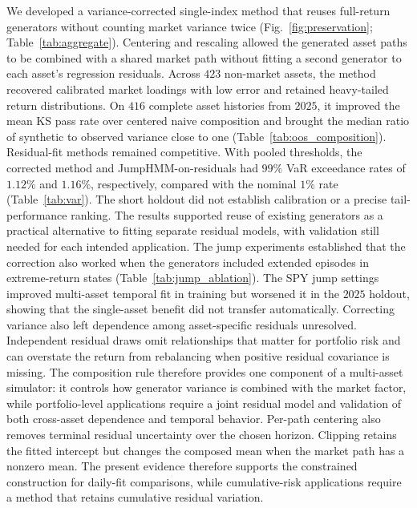 We developed a variance-corrected single-index method that reuses
full-return generators without counting market variance twice (Fig.~\ref{fig:preservation};
Table~\ref{tab:aggregate}). Centering and rescaling allowed the
generated asset paths to be combined with a shared market path without
fitting a second generator to each asset's regression residuals.
Across $423$ non-market assets, the method recovered calibrated
market loadings with low error and retained heavy-tailed return
distributions. On $416$ complete asset histories from $2025$, it
improved the mean KS pass rate over centered naive composition and
brought the median ratio of synthetic to observed variance close to
one (Table~\ref{tab:oos_composition}). Residual-fit methods remained competitive. With pooled thresholds,
the corrected method and JumpHMM-on-residuals had $99\%$ VaR
exceedance rates of $1.12\%$ and $1.16\%$, respectively, compared
with the nominal $1\%$ rate (Table~\ref{tab:var}). The short holdout
did not establish calibration or a precise tail-performance ranking. The results supported reuse of existing
generators as a practical alternative to fitting separate residual
models, with validation still needed for each intended application.
The jump experiments established that the correction also worked when
the generators included extended episodes in extreme-return states
(Table~\ref{tab:jump_ablation}).
The SPY jump settings improved multi-asset temporal fit in training
but worsened it in the $2025$ holdout, showing that the single-asset
benefit did not transfer automatically. Correcting variance also left
dependence among asset-specific residuals unresolved. Independent
residual draws omit relationships that matter for portfolio risk and
can overstate the return from rebalancing when positive residual
covariance is missing. The composition rule therefore provides one
component of a multi-asset simulator: it controls how generator
variance is combined with the market factor, while portfolio-level
applications require a joint residual model and validation of both
cross-asset dependence and temporal behavior. Per-path centering also
removes terminal residual uncertainty over the chosen horizon.
Clipping retains the fitted intercept but changes the composed mean
when the market path has a nonzero mean. The present evidence
therefore supports the constrained construction for
daily-fit comparisons, while cumulative-risk applications require a
method that retains cumulative residual variation.
